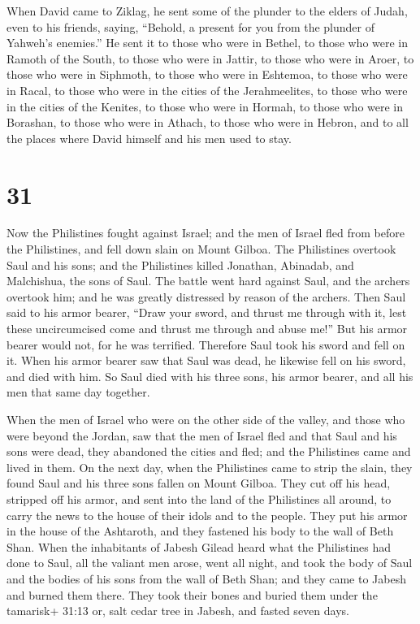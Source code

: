  When David came to Ziklag, he sent some of the plunder to
the elders of Judah, even to his friends, saying, ``Behold, a present
for you from the plunder of Yahweh's enemies.''  He sent it
to those who were in Bethel, to those who were in Ramoth of the South,
to those who were in Jattir,  to those who were in Aroer,
to those who were in Siphmoth, to those who were in Eshtemoa,
 to those who were in Racal, to those who were in the
cities of the Jerahmeelites, to those who were in the cities of the
Kenites,  to those who were in Hormah, to those who were in
Borashan, to those who were in Athach,  to those who were
in Hebron, and to all the places where David himself and his men used to
stay.

\hypertarget{section-30}{%
\section{31}\label{section-30}}

 Now the Philistines fought against Israel; and the men of
Israel fled from before the Philistines, and fell down slain on Mount
Gilboa.  The Philistines overtook Saul and his sons; and the
Philistines killed Jonathan, Abinadab, and Malchishua, the sons of Saul.
 The battle went hard against Saul, and the archers overtook
him; and he was greatly distressed by reason of the archers.
 Then Saul said to his armor bearer, ``Draw your sword, and
thrust me through with it, lest these uncircumcised come and thrust me
through and abuse me!'' But his armor bearer would not, for he was
terrified. Therefore Saul took his sword and fell on it. 
When his armor bearer saw that Saul was dead, he likewise fell on his
sword, and died with him.  So Saul died with his three sons,
his armor bearer, and all his men that same day together.

 When the men of Israel who were on the other side of the
valley, and those who were beyond the Jordan, saw that the men of Israel
fled and that Saul and his sons were dead, they abandoned the cities and
fled; and the Philistines came and lived in them.  On the
next day, when the Philistines came to strip the slain, they found Saul
and his three sons fallen on Mount Gilboa.  They cut off his
head, stripped off his armor, and sent into the land of the Philistines
all around, to carry the news to the house of their idols and to the
people.  They put his armor in the house of the Ashtaroth,
and they fastened his body to the wall of Beth Shan.  When
the inhabitants of Jabesh Gilead heard what the Philistines had done to
Saul,  all the valiant men arose, went all night, and took
the body of Saul and the bodies of his sons from the wall of Beth Shan;
and they came to Jabesh and burned them there.  They took
their bones and buried them under the tamarisk+ 31:13 or, salt cedar
tree in Jabesh, and fasted seven days.
